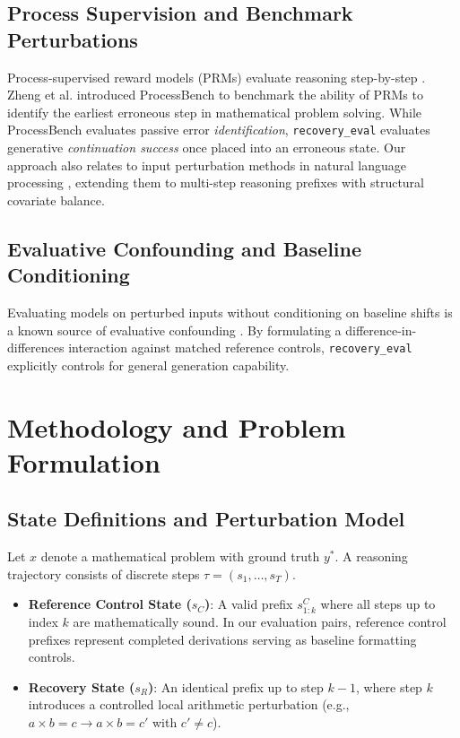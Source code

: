 \documentclass[conference]{IEEEtran}
\begin{document}
\subsection{Process Supervision and Benchmark Perturbations}
Process-supervised reward models (PRMs) evaluate reasoning step-by-step \cite{lightman2023process, wang2024mathshepherd}. Zheng et al. \cite{zheng2024processbench} introduced ProcessBench to benchmark the ability of PRMs to identify the earliest erroneous step in mathematical problem solving. While ProcessBench evaluates passive error \textit{identification}, \texttt{recovery\_eval} evaluates generative \textit{continuation success} once placed into an erroneous state. Our approach also relates to input perturbation methods in natural language processing \cite{ribeiro2020beyond, gardner2020evaluating}, extending them to multi-step reasoning prefixes with structural covariate balance.

\subsection{Evaluative Confounding and Baseline Conditioning}
Evaluating models on perturbed inputs without conditioning on baseline shifts is a known source of evaluative confounding \cite{madaan2023selfrefine, shinn2023reflexion}. By formulating a difference-in-differences interaction against matched reference controls, \texttt{recovery\_eval} explicitly controls for general generation capability.

\section{Methodology and Problem Formulation}

\subsection{State Definitions and Perturbation Model}
Let $x$ denote a mathematical problem with ground truth $y^*$. A reasoning trajectory consists of discrete steps $\tau = (s_1, \dots, s_T)$.
\begin{itemize}
    \item \textbf{Reference Control State ($s_C$)}: A valid prefix $s_{1:k}^C$ where all steps up to index $k$ are mathematically sound. In our evaluation pairs, reference control prefixes represent completed derivations serving as baseline formatting controls.
    \item \textbf{Recovery State ($s_R$)}: An identical prefix up to step $k-1$, where step $k$ introduces a controlled local arithmetic perturbation (e.g., $a \times b = c \rightarrow a \times b = c'$ with $c' \ne c$).
\end{itemize}
\end{document}
